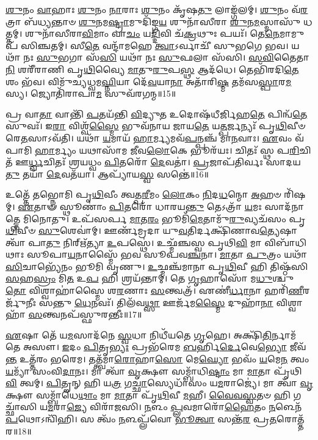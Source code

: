 \-\ul{𑌶𑍁}\-𑌨𑌂 \ul{𑌵𑌾}\-𑌹𑌾𑌃  \ul{𑌶𑍁}\-𑌨𑌂 \ul{𑌨𑌾}\-𑌰𑌾𑌃  \ul{𑌶𑍁}\-𑌨𑌂 𑌕𑍃᳴𑌷\-\ul{𑌤𑍁} 𑌲𑌾𑌙𑍍𑌗᳴𑌲𑌮𑍍। 
\-\ul{𑌶𑍁}\-𑌨𑌂 𑌵᳴\-\ul{𑌰}\-𑌤𑍍𑌰𑌾 𑌬᳴𑌧𑍍𑌯𑌨𑍍𑌤𑌾𑍞 \ul{𑌶𑍁}\-𑌨𑌮\-\ul{𑌷𑍍𑌟𑍍𑌰𑌾}\-𑌮𑍁𑌦𑌿᳴𑌙𑍍𑌗\-\ul{𑌯} 𑌶𑍁𑌨𑌾᳴𑌸𑍀𑌰𑌾 \ul{𑌶𑍁}\-𑌨\-\ul{𑌮}\-𑌸𑍍𑌮𑌾𑌸𑍁᳴ 𑌧𑌤𑍍𑌤𑌮𑍍। 
𑌶𑍁𑌨𑌾᳴𑌸𑍀𑌰𑌾\-\ul{𑌵𑌿}\-𑌮𑌾𑌂 𑌵𑌾\-\ul{𑌚𑌂} 𑌯\-\ul{𑌦𑍍𑌦𑌿}\-𑌵𑌿 𑌚᳴\-\ul{𑌕𑍍𑌰}\-𑌥𑍁𑌃 𑌪𑌯𑌃᳴। 
𑌤𑍇\-\ul{𑌨𑍇}\-𑌮𑌾𑌮𑍁𑌪᳴ 𑌸𑌿𑌞𑍍𑌚𑌤𑌮𑍍। 
𑌸𑍀\-\ul{𑌤𑍇} 𑌵𑌨𑍍𑌦𑌾᳴𑌮𑌹𑍇 \ul{𑌤𑍍𑌵𑌾}\-𑌽𑌰𑍍𑌵𑌾𑌚𑍀᳴ 𑌸𑍁𑌭𑌗𑍇 𑌭𑌵। 
𑌯𑌥𑌾᳴ 𑌨𑌃 \ul{𑌸𑍁}\-𑌭𑌗𑌾 𑌸᳴\-\ul{𑌸𑌿} 𑌯𑌥𑌾᳴ 𑌨𑌃 \ul{𑌸𑍁}\-𑌫𑌲𑌾 𑌸᳴𑌸𑌿। 
\-\ul{𑌸}\-\-\ul{𑌵𑌿}\-𑌤𑍈𑌤𑌾\-\ul{𑌨𑌿} 𑌶𑌰𑍀᳴𑌰𑌾𑌣𑌿 𑌪𑍃\-\ul{𑌥𑌿}\-𑌵𑍍𑌯𑍈 \ul{𑌮𑌾}\-𑌤𑍁\-\ul{𑌰𑍁}\-𑌪\-\ul{𑌸𑍍𑌥} 𑌆𑌦᳴𑌧𑍇। 
𑌤𑍇𑌭𑌿᳴𑌰𑌦𑌿\-\ul{𑌤𑍇} 𑌶𑌂 𑌭᳴𑌵। 
𑌵𑌿𑌮𑍁᳴𑌚𑍍𑌯𑌧𑍍𑌵𑌮\-\ul{𑌘𑍍𑌨𑌿}\-𑌯𑌾 𑌦𑍇᳴\-\ul{𑌵}\-𑌯𑌾\-\ul{𑌨𑌾} 𑌅𑌤𑌾᳴𑌰𑌿\-\ul{𑌷𑍍𑌮} 𑌤𑌮᳴𑌸\-\ul{𑌸𑍍𑌪𑌾}\-𑌰\-\ul{𑌮}\-𑌸𑍍𑌯। 
𑌜𑍍𑌯𑍋𑌤𑌿᳴𑌰𑌾𑌪𑌾\-\ul{𑌮} 𑌸𑍁𑌵᳴𑌰𑌗𑌨𑍍𑌮॥15॥

𑌪𑍍𑌰 𑌵𑌾\-\ul{𑌤𑌾} 𑌵𑌾𑌨𑍍𑌤𑌿᳴ \ul{𑌪}\-𑌤𑌯᳴𑌨𑍍𑌤𑌿 \ul{𑌵𑌿}\-𑌦𑍍𑌯𑍁\-\ul{𑌤} 𑌉𑌦𑍋𑌷᳴𑌧𑍀𑌰𑍍𑌜𑌿𑌹\-\ul{𑌤𑍇} 𑌪𑌿𑌨𑍍𑌵᳴\-\ul{𑌤𑍇} 𑌸𑍁𑌵𑌃᳴। 
𑌇\-\ul{𑌰𑌾} 𑌵𑌿𑌶𑍍𑌵᳴\-\ul{𑌸𑍍𑌮𑍈} 𑌭𑍁𑌵᳴𑌨𑌾𑌯 𑌜𑌾𑌯\-\ul{𑌤𑍇} 𑌯\-\ul{𑌤𑍍𑌪}\-𑌰𑍍𑌜𑌨𑍍𑌯𑌃᳴ 𑌪𑍃\-\ul{𑌥𑌿}\-𑌵𑍀𑍞 𑌰𑍇\-\ul{𑌤}\-𑌸𑌾𑌽𑌵᳴𑌤𑌿। 
𑌯𑌥𑌾᳴ \ul{𑌯}\-𑌮𑌾𑌯᳴ \ul{𑌹𑌾}\-𑌰𑍍𑌮𑍍𑌯𑌮𑌵᳴\-\ul{𑌪}\-𑌨𑍍𑌪𑌞𑍍𑌚᳴ 𑌮𑌾\-\ul{𑌨}\-𑌵𑌾𑌃। 
\-\ul{𑌏}\-𑌵𑌂 𑌵᳴𑌪𑌾𑌮𑌿 \ul{𑌹𑌾}\-𑌰𑍍𑌮𑍍𑌯𑌂 𑌯𑌥𑌾𑌸𑌾᳴𑌮 𑌜𑍀𑌵\-\ul{𑌲𑍋}\-𑌕𑍇 𑌭𑍂𑌰᳴𑌯𑌃। 
𑌚𑌿𑌤𑌃᳴ 𑌸𑍍𑌥 𑌪\-\ul{𑌰𑌿}\-𑌚𑌿𑌤᳴ 𑌊\-\ul{𑌰𑍍𑌧𑍍𑌵}\-𑌚𑌿𑌤𑌃᳴  𑌶𑍍𑌰𑌯𑌧𑍍𑌵𑌂 \ul{𑌪𑌿}\-𑌤𑌰𑍋᳴ \ul{𑌦𑍇}\-𑌵𑌤𑌾॑। 
\-\ul{𑌪𑍍𑌰}\-𑌜𑌾𑌪᳴𑌤𑌿𑌰𑍍𑌵𑌃 𑌸𑌾𑌦𑌯\-\ul{𑌤𑍁} 𑌤𑌯𑌾᳴ \ul{𑌦𑍇}\-𑌵𑌤᳴𑌯𑌾। 
𑌆𑌪𑍍𑌯𑌾᳴𑌯\-\ul{𑌸𑍍𑌵} 𑌸𑌨𑍍𑌤𑍇॑॥16॥
\anuvakamend[\-\ul{𑌅}\-\-\ul{𑌘𑍍𑌨𑌿}\-𑌯𑌾 𑌅᳴𑌗𑌨𑍍𑌮 \ul{𑌸}\-𑌪𑍍𑌤 𑌚᳴]

𑌉𑌤𑍍𑌤𑍇᳴ 𑌤𑌭𑍍𑌨𑍋𑌮𑌿 𑌪𑍃\-\ul{𑌥𑌿}\-𑌵𑍀𑌂 𑌤𑍍𑌵𑌤𑍍𑌪\-\ul{𑌰𑍀}\-𑌮𑌂 \ul{𑌲𑍋}\-𑌕𑌂 \ul{𑌨𑌿}\-𑌦\-\ul{𑌧}\-𑌨𑍍𑌮𑍋 \ul{𑌅}\-𑌹𑍞 𑌰𑌿᳴𑌷𑌮𑍍। 
\-\ul{𑌏}\-𑌤𑌾𑍟 𑌸𑍍𑌥𑍂𑌣𑌾𑌂॑ \ul{𑌪𑌿}\-𑌤𑌰𑍋᳴ 𑌧𑌾𑌰𑌯\-\ul{𑌨𑍍𑌤𑍁} 𑌤𑍇𑌽𑌤𑍍𑌰𑌾᳴ \ul{𑌯}\-𑌮𑌃 𑌸𑌾𑌦᳴𑌨𑌾𑌤𑍍𑌤𑍇 𑌮𑌿𑌨𑍋𑌤𑍁। 
𑌉𑌪᳴𑌸𑌰𑍍𑌪 \ul{𑌮𑌾}\-𑌤\-\ul{𑌰𑌂} 𑌭𑍂𑌮𑌿᳴\-\ul{𑌮𑍇}\-𑌤𑌾𑌮𑍁᳴\-\ul{𑌰𑍁}\-𑌵𑍍𑌯𑌚᳴𑌸𑌂 𑌪𑍃\-\ul{𑌥𑌿}\-𑌵𑍀𑍞 \ul{𑌸𑍁}\-𑌶𑍇𑌵𑌾॑𑌮𑍍। 
𑌊𑌰𑍍𑌣᳴𑌮𑍍𑌰𑌦𑌾 𑌯𑍁\-\ul{𑌵}\-𑌤𑌿𑌰𑍍𑌦𑌕𑍍𑌷𑌿᳴𑌣𑌾𑌵\-\ul{𑌤𑍍𑌯𑍇}\-𑌷𑌾 𑌤𑍍𑌵𑌾᳴ 𑌪𑌾\-\ul{𑌤𑍁} 𑌨𑌿𑌰𑍍\mbox{}𑌋᳴𑌤𑍍𑌯𑌾 \ul{𑌉}\-𑌪𑌸𑍍𑌥𑍇॑। 
𑌉𑌛𑍍𑌮᳴𑌞𑍍𑌚𑌸𑍍𑌵 𑌪𑍃𑌥𑌿\-\ul{𑌵𑌿} 𑌮𑌾 𑌵𑌿𑌬𑌾᳴𑌧𑌿𑌥𑌾𑌃 𑌸𑍂𑌪𑌾\-\ul{𑌯}\-𑌨𑌾𑌸𑍍𑌮𑍈᳴ 𑌭𑌵 𑌸𑍂𑌪𑌵\-\ul{𑌞𑍍𑌚}\-𑌨𑌾। 
\-\ul{𑌮𑌾}\-𑌤𑌾 \ul{𑌪𑍁}\-𑌤𑍍𑌰𑌂 𑌯𑌥𑌾᳴\-\ul{𑌸𑌿}\-𑌚𑌾𑌭𑍍𑌯𑍇᳴𑌨𑌂 𑌭𑍂𑌮𑌿 𑌵𑍃𑌣𑍁। 
\-\ul{𑌉}\-𑌛𑍍𑌮𑌞𑍍𑌚᳴𑌮𑌾𑌨𑌾 𑌪𑍃\-\ul{𑌥𑌿}\-𑌵𑍀 𑌹𑌿 𑌤𑌿𑌷𑍍𑌠᳴𑌸𑌿 \ul{𑌸}\-𑌹\-\ul{𑌸𑍍𑌰𑌂} 𑌮𑌿\-\ul{𑌤} 𑌉\-\ul{𑌪} 𑌹𑌿 𑌶𑍍𑌰𑌯᳴𑌨𑍍𑌤𑌾𑌮𑍍। 
𑌤𑍇 \ul{𑌗𑍃}\-𑌹𑌾𑌸𑍋᳴ 𑌮\-\ul{𑌧𑍁}\-𑌶𑍍𑌚𑍁\-\ul{𑌤𑍋} 𑌵𑌿𑌶𑍍𑌵𑌾𑌹𑌾॑𑌸𑍍𑌮𑍈 𑌶\-\ul{𑌰}\-𑌣𑌾𑌃 \ul{𑌸}\-𑌨𑍍𑌤𑍍𑌵𑌤𑍍𑌰᳴। 
𑌏𑌣𑍀॑\-\ul{𑌰𑍍𑌧𑌾}\-𑌨𑌾 𑌹𑌰𑌿᳴\-\ul{𑌣𑍀}\-𑌰𑌰𑍍𑌜𑍁᳴𑌨𑍀𑌃 𑌸𑌨𑍍𑌤𑍁 \ul{𑌧𑍇}\-𑌨𑌵𑌃᳴। 
𑌤𑌿𑌲᳴𑌵\-\ul{𑌥𑍍𑌸𑌾} 𑌊𑌰𑍍𑌜᳴𑌮\-\ul{𑌸𑍍𑌮𑍈} 𑌦𑍁𑌹𑌾᳴\-\ul{𑌨𑌾} 𑌵𑌿𑌶𑍍𑌵𑌾𑌹𑌾᳴ \ul{𑌸}\-𑌨𑍍𑌤𑍍𑌵𑌨𑌪᳴𑌸𑍍𑌫𑍁𑌰𑌨𑍍𑌤𑍀𑌃॥17॥

\-\ul{𑌏}\-𑌷𑌾 𑌤𑍇᳴ 𑌯\-\ul{𑌮}\-𑌸𑌾𑌦᳴𑌨𑍇 \ul{𑌸𑍍𑌵}\-𑌧𑌾 𑌨𑌿𑌧𑍀᳴𑌯𑌤𑍇 \ul{𑌗𑍃}\-𑌹𑍇। 
𑌅𑌕𑍍𑌷𑌿᳴\-\ul{𑌤𑌿}\-𑌰𑍍𑌨𑌾𑌮᳴ 𑌤𑍇 𑌅𑌸𑍗। 
\-\ul{𑌇}\-𑌦𑌂 \ul{𑌪𑌿}\-𑌤𑍃\-\ul{𑌭𑍍𑌯𑌃} 𑌪𑍍𑌰𑌭᳴𑌰𑍇𑌮 \ul{𑌬}\-𑌰𑍍\mbox{}𑌹𑌿\-\ul{𑌰𑍍𑌦𑍇}\-𑌵𑍇\-\ul{𑌭𑍍𑌯𑍋} 𑌜𑍀𑌵᳴\-\ul{𑌨𑍍𑌤} 𑌉𑌤𑍍𑌤᳴𑌰𑌂 𑌭𑌰𑍇𑌮। 
𑌤𑌤𑍍𑌤𑍍𑌵᳴𑌮𑌾\-\ul{𑌰𑍋}\-𑌹𑌾\-\ul{𑌸𑍋} 𑌮𑍇\-\ul{𑌘𑍍𑌯𑍋} 𑌭𑌵𑌂᳴ \ul{𑌯}\-𑌮𑍇\-\ul{𑌨} 𑌤𑍍𑌵𑌂 \ul{𑌯}\-𑌮𑍍𑌯𑌾᳴ 𑌸𑌂𑌵𑌿\-\ul{𑌦𑌾}\-𑌨𑌃। 
𑌮𑌾 𑌤𑍍𑌵𑌾᳴ \ul{𑌵𑍃}\-𑌕𑍍𑌷𑍗 𑌸𑌮𑍍𑌬𑌾᳴𑌧𑌿\-\ul{𑌷𑍍𑌟𑌾𑌂} 𑌮𑌾 \ul{𑌮𑌾}\-𑌤𑌾 𑌪𑍃᳴𑌥𑌿\-\ul{𑌵𑌿} 𑌤𑍍𑌵𑌮𑍍। 
\-\ul{𑌪𑌿}\-𑌤𑍄𑌨𑍍 𑌹𑌿 𑌯\-\ul{𑌤𑍍𑌰} 𑌗\-\ul{𑌚𑍍𑌛𑌾}\-𑌸𑍍𑌯𑍇𑌧𑌾᳴𑌸𑌂 𑌯\-\ul{𑌮}\-𑌰𑌾𑌜𑍍𑌯𑍇॑। 
𑌮𑌾 𑌤𑍍𑌵𑌾᳴ \ul{𑌵𑍃}\-𑌕𑍍𑌷𑍗 𑌸𑌮𑍍𑌬𑌾᳴𑌧𑍇\-\ul{𑌥𑌾𑌂} 𑌮𑌾 \ul{𑌮𑌾}\-𑌤𑌾 𑌪𑍃᳴\-\ul{𑌥𑌿}\-𑌵𑍀 \ul{𑌮}\-𑌹𑍀। 
\-\ul{𑌵𑍈}\-\-\ul{𑌵}\-\-\ul{𑌸𑍍𑌵}\-𑌤𑍞 𑌹𑌿 𑌗𑌚𑍍𑌛𑌾᳴𑌸𑌿 𑌯\-\ul{𑌮}\-𑌰𑌾\-\ul{𑌜𑍍𑌯𑍇} 𑌵𑌿𑌰𑌾᳴𑌜𑌸𑌿। 
\-\ul{𑌨}\-𑌳𑌂 \ul{𑌪𑍍𑌲}\-𑌵𑌮𑌾𑌰𑍋᳴\-\ul{𑌹𑍈}\-𑌤𑌂 \ul{𑌨}\-𑌳𑍇𑌨᳴ \ul{𑌪}\-𑌥𑍋𑌽𑌨𑍍𑌵𑌿᳴𑌹𑌿। 
𑌸 𑌤𑍍𑌵𑌂᳴ \ul{𑌨}\-𑌳𑌪𑍍𑌲᳴𑌵𑍋 \ul{𑌭𑍂}\-\-\ul{𑌤𑍍𑌵𑌾} 𑌸𑌨𑍍𑌤᳴\-\ul{𑌰} 𑌪𑍍𑌰\-\ul{𑌤}\-𑌰𑍋𑌤𑍍𑌤᳴𑌰॥18॥

